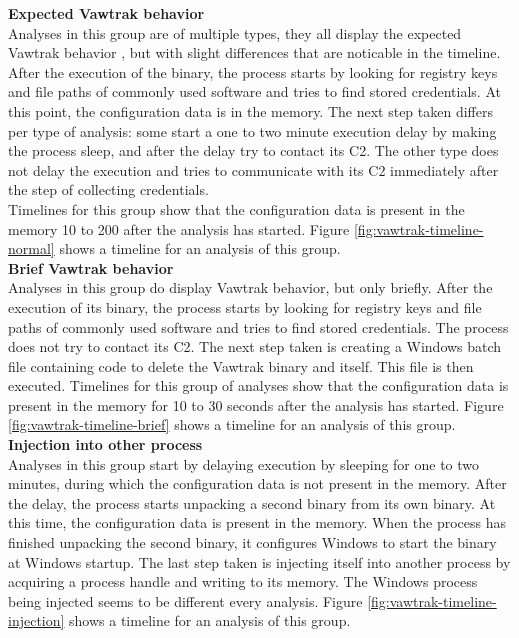 \documentclass[conference]{IEEEtran}
\begin{document}
\newpage

\textbf{Expected Vawtrak behavior}
\\Analyses in this group are of multiple types, they all display the expected Vawtrak behavior \cite{kroustek-vawtrak}, but with slight differences that are noticable in the timeline. \\After the execution of the binary, the process starts by looking for registry keys and file paths of commonly used software and tries to find stored credentials. At this point, the configuration data is in the memory. The next step taken differs per type of analysis: some start a one to two minute execution delay by making the process sleep, and after the delay try to contact its C2. The other type does not delay the execution and  tries to communicate with its C2 immediately after the step of collecting credentials.\\ Timelines for this group show that the configuration data is present in the memory 10 to 200 after the analysis has started. Figure \ref{fig:vawtrak-timeline-normal} shows a timeline for an analysis of this group.\\


\textbf{Brief Vawtrak behavior}
\\Analyses in this group do display Vawtrak behavior\cite{kroustek-vawtrak}, but only briefly. After the execution of its binary, the process starts by looking for registry keys and file paths of commonly used software and tries to find stored credentials. The process does not try to contact its C2. The next step taken is creating a Windows batch file containing code to delete the Vawtrak binary and itself. This file is then executed. Timelines for this group of analyses show that the configuration data is present in the memory for 10 to 30 seconds after the analysis has started. Figure \ref{fig:vawtrak-timeline-brief} shows a timeline for an analysis of this group.\\

\textbf{Injection into other process}
\\Analyses in this group start by delaying execution by sleeping for one to two minutes, during which the configuration data is not present in the memory. After the delay, the process starts unpacking a second binary from its own binary. At this time, the configuration data is present in the memory. When the process has finished unpacking the second binary, it configures Windows to start the binary at Windows startup. The last step taken is injecting itself into another process by acquiring a process handle and writing to its memory. The Windows process being injected seems to be different every analysis. Figure \ref{fig:vawtrak-timeline-injection} shows a timeline for an analysis of this group.\\
\end{document}
